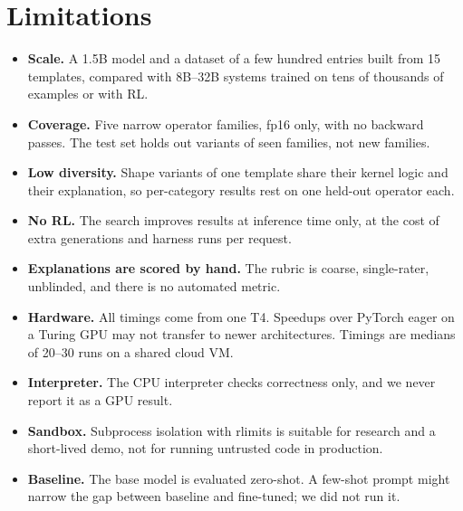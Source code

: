 \documentclass[11pt]{article}
\begin{document}
\section{Limitations}
\label{sec:limitations}
\begin{itemize}
  \item \textbf{Scale.} A 1.5B model and a dataset of a few hundred entries built from 15
        templates, compared with 8B--32B systems trained on tens of thousands of examples or with RL.
  \item \textbf{Coverage.} Five narrow operator families, fp16 only, with no backward passes. The test
        set holds out variants of seen families, not new families.
  \item \textbf{Low diversity.} Shape variants of one template share their kernel logic and their
        explanation, so per-category results rest on one held-out operator each.
  \item \textbf{No RL.} The search improves results at inference time only, at the cost of extra
        generations and harness runs per request.
  \item \textbf{Explanations are scored by hand.} The rubric is coarse, single-rater, unblinded,
        and there is no automated metric.
  \item \textbf{Hardware.} All timings come from one T4. Speedups over PyTorch eager on a Turing GPU
        may not transfer to newer architectures. Timings are medians of 20--30 runs on a shared cloud VM.
  \item \textbf{Interpreter.} The CPU interpreter checks correctness only, and we never
        report it as a GPU result.
  \item \textbf{Sandbox.} Subprocess isolation with rlimits is suitable for research and a short-lived
        demo, not for running untrusted code in production.
  \item \textbf{Baseline.} The base model is evaluated zero-shot. A few-shot prompt might
        narrow the gap between baseline and fine-tuned; we did not run it.
\end{itemize}

\end{document}

